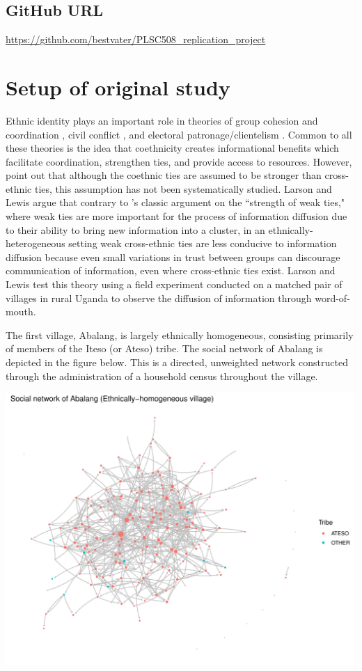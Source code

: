 \documentclass[]{article}
\begin{document}
\subsection{GitHub URL}

\url{https://github.com/bestvater/PLSC508_replication_project}

\newpage

\section{Setup of original study}

Ethnic identity plays an important role in theories of group cohesion and coordination \citep{FearonLaitin_1996}, civil conflict \citep{Varshney_2003}, and electoral patronage/clientelism \citep{Posner_2004}. Common to all these theories is the idea that coethnicity creates informational benefits which facilitate coordination, strengthen ties, and provide access to resources. However, \citet{LarsonLewis_2017} point out that although the coethnic ties are assumed to be stronger than cross-ethnic ties, this assumption has not been systematically studied. Larson and Lewis argue that contrary to \citet{Granovetter_1973}'s classic argument on the ``strength of weak ties," where weak ties are more important for the process of information diffusion due to their ability to bring new information into a cluster, in an ethnically-heterogeneous setting weak cross-ethnic ties are less conducive to information diffusion because even small variations in trust between groups can discourage communication of information, even where cross-ethnic ties exist. Larson and Lewis test this theory using a field experiment conducted on a matched pair of villages in rural Uganda to observe the diffusion of information through word-of-mouth. 

The first village, Abalang, is largely ethnically homogeneous, consisting primarily of members of the Iteso (or Ateso) tribe. The social network of Abalang is depicted in the figure below. This is a directed, unweighted network constructed through the administration of a household census throughout the village.

\includegraphics{./figures/abalang_net.pdf}
\end{document}
